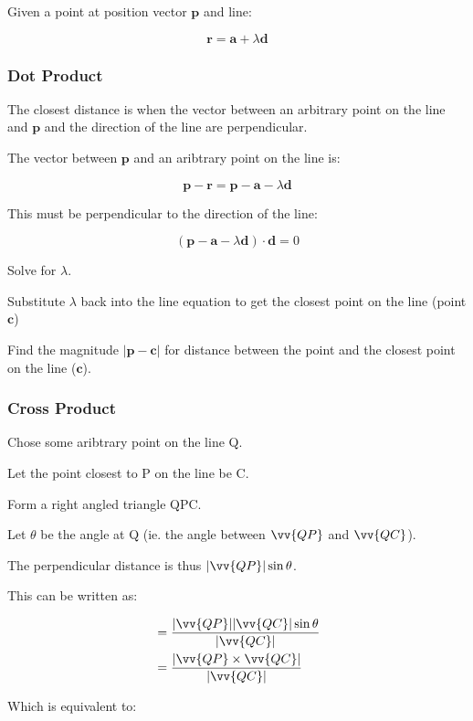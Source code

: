 \documentclass[a4paper,11pt]{article}
\newcommand{\bb}{\boldsymbol}
\begin{document}
Given a point at position vector $\bb{p}$ and line:

$$
\bb{r} = \bb{a} + \lambda \bb{d}
$$


\subsubsection{Dot Product}

The closest distance is when the vector between an arbitrary point on the line
and $\bb{p}$ and the direction of the line are perpendicular.

The vector between $\bb{p}$ and an aribtrary point on the line is:

$$
\bb{p} - \bb{r} = \bb{p} - \bb{a} - \lambda \bb{d}
$$

This must be perpendicular to the direction of the line:

$$
(\bb{p} - \bb{a} - \lambda \bb{d}) \cdot \bb{d} = 0
$$

Solve for $\lambda$.

Substitute $\lambda$ back into the line equation to get the closest point on
the line (point $\bb{c}$)

Find the magnitude $\lvert \bb{p} - \bb{c} \rvert$ for distance between the
point and the closest point on the line ($\bb{c}$).


\subsubsection{Cross Product}

Chose some aribtrary point on the line Q.

Let the point closest to P on the line be C.

Form a right angled triangle QPC.

Let $\theta$ be the angle at Q (ie. the angle between $\vv{QP}$ and
$\vv{QC}$).

The perpendicular distance is thus $\lvert \vv{QP} \rvert \sin{\theta}$.

This can be written as:

$$
\begin{aligned}
& = \frac{\lvert \vv{QP} \rvert \lvert \vv{QC} \rvert \sin{\theta}}{\lvert \vv{QC} \rvert} \\
& = \frac{\lvert \vv{QP} \times \vv{QC} \rvert}{\lvert \vv{QC} \rvert} \\
\end{aligned}
$$

Which is equivalent to:
\end{document}
